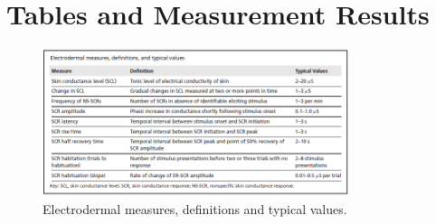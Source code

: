 

\chapter{Tables and Measurement Results}

\begin{figure}[h]
\centering
\includegraphics[width=0.8\textwidth]{images/tableEDA.png}
\caption{Electrodermal measures, definitions and typical values.}
\label{EDAtabImg}
\end{figure}
